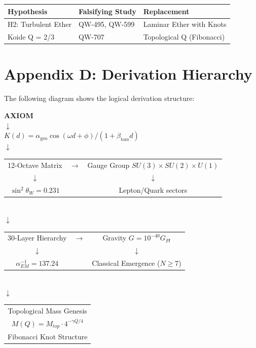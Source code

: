 \documentclass[11pt,a4paper]{book}
\theoremstyle{remark}
\newcommand{\alphageo}{\alpha_{\text{geo}}}
\newcommand{\betators}{\beta_{\text{tors}}}
\begin{document}
\begin{center}
\begin{tabular}{|l|l|l|}
\hline
\textbf{Hypothesis} & \textbf{Falsifying Study} & \textbf{Replacement} \\
\hline
H2: Turbulent Ether & QW-495, QW-599 & Laminar Ether with Knots \\
Koide Q = 2/3 & QW-707 & Topological Q (Fibonacci) \\
\hline
\end{tabular}
\end{center}

\section{Appendix D: Derivation Hierarchy}

The following diagram shows the logical derivation structure:

\begin{center}
\textbf{AXIOM} \\
$\downarrow$ \\
$K(d) = \alphageo \cos(\omega d + \phi) / (1 + \betators d)$ \\
$\downarrow$ \\
\begin{tabular}{ccc}
12-Octave Matrix & $\rightarrow$ & Gauge Group $SU(3) \times SU(2) \times U(1)$ \\
$\downarrow$ & & $\downarrow$ \\
$\sin^2\theta_W = 0.231$ & & Lepton/Quark sectors \\
\end{tabular}
\\[0.5cm]
$\downarrow$ \\
\begin{tabular}{ccc}
30-Layer Hierarchy & $\rightarrow$ & Gravity $G = 10^{-40} G_{Pl}$ \\
$\downarrow$ & & $\downarrow$ \\
$\alpha_{EM}^{-1} = 137.24$ & & Classical Emergence ($N \geq 7$) \\
\end{tabular}
\\[0.5cm]
$\downarrow$ \\
\begin{tabular}{c}
Topological Mass Genesis \\
$M(Q) = M_{top} \cdot 4^{-\gamma Q/4}$ \\
Fibonacci Knot Structure \\
\end{tabular}
\end{center}
\end{document}
